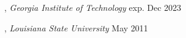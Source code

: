 
, \textit{Georgia Institute of Technology}	\hfill exp. Dec 2023

, \textit{Louisiana State University} \hfill	May 2011


